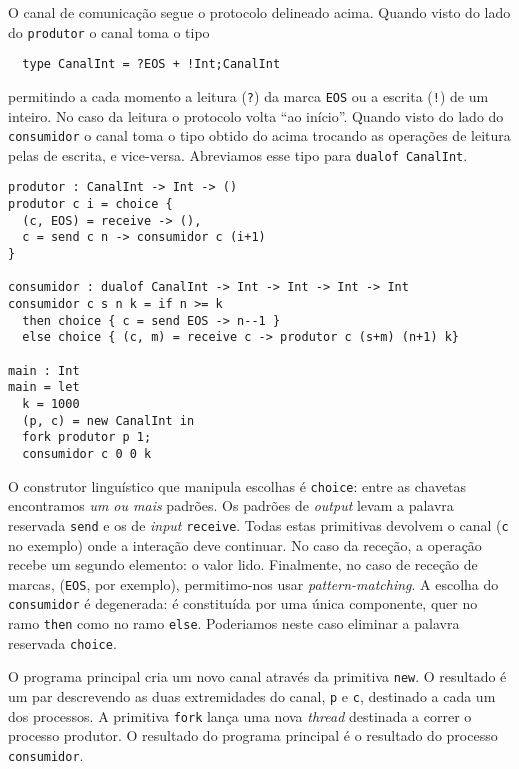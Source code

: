 O canal de comunicação segue o  protocolo delineado acima. Quando
visto do lado do \lstinline|produtor| o canal toma o tipo
%
\begin{lstlisting}
  type CanalInt = ?EOS + !Int;CanalInt
\end{lstlisting}
%
permitindo a cada momento a leitura (\lstinline|?|) da marca
\lstinline|EOS| ou a escrita (\lstinline|!|) de um inteiro. No caso da
leitura o protocolo volta ``ao início''.
%
Quando visto do lado do \lstinline|consumidor| o canal toma o tipo
obtido do acima trocando as operações de leitura pelas de escrita, e
vice-versa. Abreviamos esse tipo para \lstinline|dualof CanalInt|.

\begin{lstlisting}
produtor : CanalInt -> Int -> ()
produtor c i = choice {
  (c, EOS) = receive -> (),
  c = send c n -> consumidor c (i+1)
}

consumidor : dualof CanalInt -> Int -> Int -> Int -> Int
consumidor c s n k = if n >= k
  then choice { c = send EOS -> n--1 }
  else choice { (c, m) = receive c -> produtor c (s+m) (n+1) k}

main : Int
main = let
  k = 1000
  (p, c) = new CanalInt in
  fork produtor p 1;
  consumidor c 0 0 k
\end{lstlisting}

O construtor linguístico que manipula escolhas é \lstinline|choice|:
entre as chavetas encontramos \emph{um ou mais} padrões. Os padrões de
\textit{output} levam a palavra reservada \lstinline|send| e os de
\textit{input} \lstinline|receive|. Todas estas primitivas devolvem o
canal (\lstinline|c| no exemplo) onde a interação deve continuar. No
caso da receção, a operação recebe um segundo elemento: o valor
lido. Finalmente, no caso de receção de marcas, (\lstinline|EOS|, por
exemplo), permitimo-nos usar \textit{pattern-matching}.
%
A escolha do \lstinline|consumidor| é degenerada: é constituída por
uma única componente, quer no ramo \lstinline|then| como no ramo
\lstinline|else|. Poderiamos neste caso eliminar a palavra reservada
\lstinline|choice|.

O programa principal cria um novo canal através da primitiva
\lstinline|new|. O resultado é um par descrevendo as duas extremidades
do canal, \lstinline|p| e \lstinline|c|, destinado a cada um dos
processos.
%
A primitiva \lstinline|fork| lança uma nova \textit{thread} destinada
a correr o processo produtor. O resultado do programa principal é o
resultado do processo \lstinline|consumidor|.

